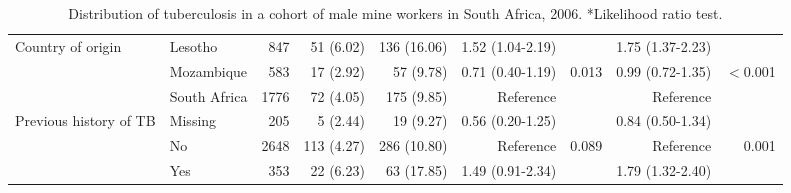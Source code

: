 \documentclass[11pt,a4paper,twoside]{article}\usepackage{graphicx, color}
\begin{document}
\begin{sidewaystable}[p]
\begin{center}
{\begin{tabular}{llrrrrrrr}
  Country of origin & Lesotho & 847 & 51 (6.02) & 136 (16.06) & 1.52 (1.04-2.19) &  & 1.75 (1.37-2.23) &  \\ 
   & Mozambique & 583 & 17 (2.92) & 57 (9.78) & 0.71 (0.40-1.19) & 0.013 & 0.99 (0.72-1.35) & $<$0.001 \\ 
   & South Africa & 1776 & 72 (4.05) & 175 (9.85) & Reference &  & Reference &  \\ 
  Previous history of TB & Missing & 205 & 5 (2.44) & 19 (9.27) & 0.56 (0.20-1.25) &  & 0.84 (0.50-1.34) &  \\ 
   & No & 2648 & 113 (4.27) & 286 (10.80) & Reference & 0.089 & Reference & 0.001 \\ 
   & Yes & 353 & 22 (6.23) & 63 (17.85) & 1.49 (0.91-2.34) &  & 1.79 (1.32-2.40) &  \\ 
   \bottomrule
\end{tabular}
}
\caption{Distribution of tuberculosis in a cohort of male mine workers in South Africa, 2006. *Likelihood ratio test.}
\label{epic}
\end{center}
\end{sidewaystable}
\end{document}
